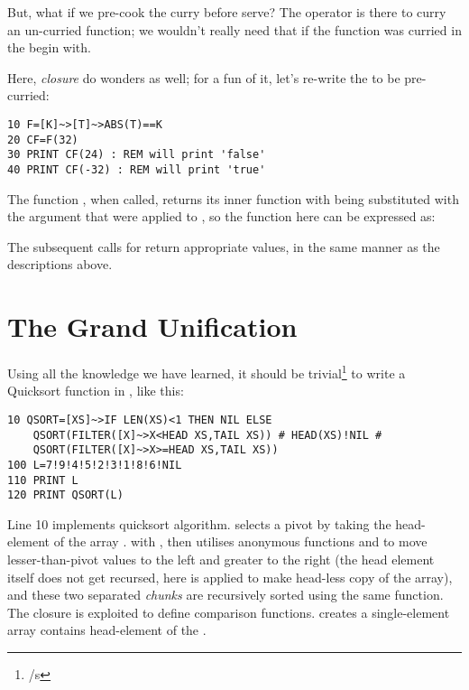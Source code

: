 But, what if we pre-cook the curry before serve? The \code{\basiccurry} operator is there to curry an un-curried function; we wouldn't really need that if the function was curried in the begin with.

Here, \emph{closure} do wonders as well; for a fun of it, let's re-write the  to be pre-curried:

\begin{lstlisting}
10 F=[K]~>[T]~>ABS(T)==K
20 CF=F(32)
30 PRINT CF(24) : REM will print 'false'
40 PRINT CF(-32) : REM will print 'true'
\end{lstlisting}

The function , when called, returns its inner function  with  being substituted with the argument that were applied to , so the function  here can be expressed as: 

The subsequent calls for  return appropriate values, in the same manner as the descriptions above.

\section[Wrapping-Up]{The Grand Unification}

Using all the knowledge we have learned, it should be trivial\footnote{/s} to write a Quicksort function in \tbas, like this:

\begin{lstlisting}
10 QSORT=[XS]~>IF LEN(XS)<1 THEN NIL ELSE 
    QSORT(FILTER([X]~>X<HEAD XS,TAIL XS)) # HEAD(XS)!NIL # 
    QSORT(FILTER([X]~>X>=HEAD XS,TAIL XS))
100 L=7!9!4!5!2!3!1!8!6!NIL
110 PRINT L
120 PRINT QSORT(L)
\end{lstlisting}

Line 10 implements quicksort algorithm.  selects a pivot by taking the head-element of the array . with , then utilises anonymous functions  and  to move lesser-than-pivot values to the left and greater to the right (the head element itself does not get recursed, here  is applied to make head-less copy of the array), and these two separated \emph{chunks} are recursively sorted using the same  function. The closure is exploited to define comparison functions.  creates a single-element array contains head-element of the .
